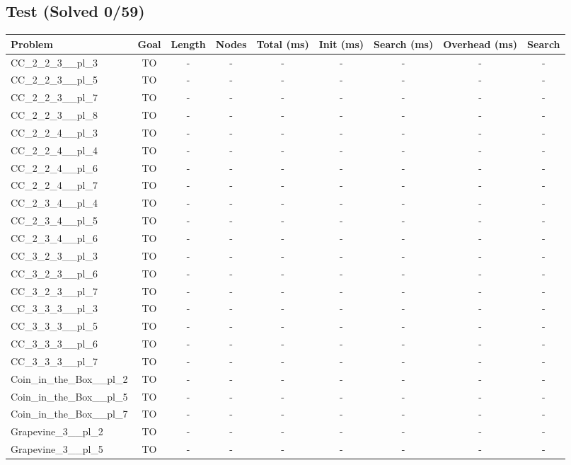 \documentclass{article}
\begin{document}
\subsection*{Test (Solved 0/59)}
\begin{tabular}{lcccccccc}
\toprule
Problem & Goal & Length & Nodes & Total (ms) & Init (ms) & Search (ms) & Overhead (ms) & Search \\
\midrule
CC\_2\_2\_3\_\_pl\_3 & TO & - & - & - & - & - & - & - \\
CC\_2\_2\_3\_\_pl\_5 & TO & - & - & - & - & - & - & - \\
CC\_2\_2\_3\_\_pl\_7 & TO & - & - & - & - & - & - & - \\
CC\_2\_2\_3\_\_pl\_8 & TO & - & - & - & - & - & - & - \\
CC\_2\_2\_4\_\_pl\_3 & TO & - & - & - & - & - & - & - \\
CC\_2\_2\_4\_\_pl\_4 & TO & - & - & - & - & - & - & - \\
CC\_2\_2\_4\_\_pl\_6 & TO & - & - & - & - & - & - & - \\
CC\_2\_2\_4\_\_pl\_7 & TO & - & - & - & - & - & - & - \\
CC\_2\_3\_4\_\_pl\_4 & TO & - & - & - & - & - & - & - \\
CC\_2\_3\_4\_\_pl\_5 & TO & - & - & - & - & - & - & - \\
CC\_2\_3\_4\_\_pl\_6 & TO & - & - & - & - & - & - & - \\
CC\_3\_2\_3\_\_pl\_3 & TO & - & - & - & - & - & - & - \\
CC\_3\_2\_3\_\_pl\_6 & TO & - & - & - & - & - & - & - \\
CC\_3\_2\_3\_\_pl\_7 & TO & - & - & - & - & - & - & - \\
CC\_3\_3\_3\_\_pl\_3 & TO & - & - & - & - & - & - & - \\
CC\_3\_3\_3\_\_pl\_5 & TO & - & - & - & - & - & - & - \\
CC\_3\_3\_3\_\_pl\_6 & TO & - & - & - & - & - & - & - \\
CC\_3\_3\_3\_\_pl\_7 & TO & - & - & - & - & - & - & - \\
Coin\_in\_the\_Box\_\_pl\_2 & TO & - & - & - & - & - & - & - \\
Coin\_in\_the\_Box\_\_pl\_5 & TO & - & - & - & - & - & - & - \\
Coin\_in\_the\_Box\_\_pl\_7 & TO & - & - & - & - & - & - & - \\
Grapevine\_3\_\_pl\_2 & TO & - & - & - & - & - & - & - \\
Grapevine\_3\_\_pl\_5 & TO & - & - & - & - & - & - & - \\

\end{tabular}
\end{document}
